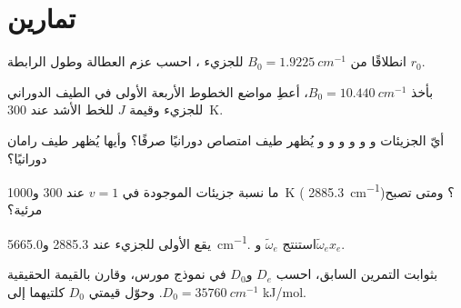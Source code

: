 \section{تمارين}

\begin{exercise}[$\star$]\label{exo:b3:rovibrational-spectroscopy:1}
انطلاقًا من $B_0 = \qty{1.9225}{cm^{-1}}$ للجزيء ، احسب عزم العطالة
وطول الرابطة $r_0$.
\end{exercise}

\begin{exercise}[$\star$]\label{exo:b3:rovibrational-spectroscopy:2}
بأخذ $B_0 = \qty{10.440}{cm^{-1}}$، أعطِ مواضع الخطوط الأربعة الأولى في
الطيف الدوراني للجزيء  وقيمة $J$ للخط الأشد عند
\qty{300}{K}.
\end{exercise}

\begin{exercise}[$\star$]\label{exo:b3:rovibrational-spectroscopy:3}
أيّ الجزيئات  و و و و و و يُظهر طيف امتصاص
دورانيًا صرفًا؟ وأيها يُظهر طيف رامان دورانيًا؟
\end{exercise}

\begin{exercise}[$\star$]\label{exo:b3:rovibrational-spectroscopy:4}
ما نسبة جزيئات  الموجودة في $v = 1$ عند 300 و\qty{1000}{K}
( \qty{2885.3}{cm^{-1}})؟ ومتى تصبح  مرئية؟
\end{exercise}

\begin{exercise}[$\star\star$]\label{exo:b3:rovibrational-spectroscopy:5}
يقع   الأولى للجزيء  عند 2885.3 
و\qty{5665.0}{cm^{-1}}. استنتج $\tilde\omega_e$ و$\tilde\omega_ex_e$.
\end{exercise}

\begin{exercise}[$\star\star$]\label{exo:b3:rovibrational-spectroscopy:6}
بثوابت التمرين السابق، احسب $D_e$ و$D_0$ في
نموذج مورس، وقارن بالقيمة الحقيقية $D_0 = \qty{35760}{cm^{-1}}$. وحوّل قيمتي
$D_0$ كلتيهما إلى \unit{kJ/mol}.
\end{exercise}

